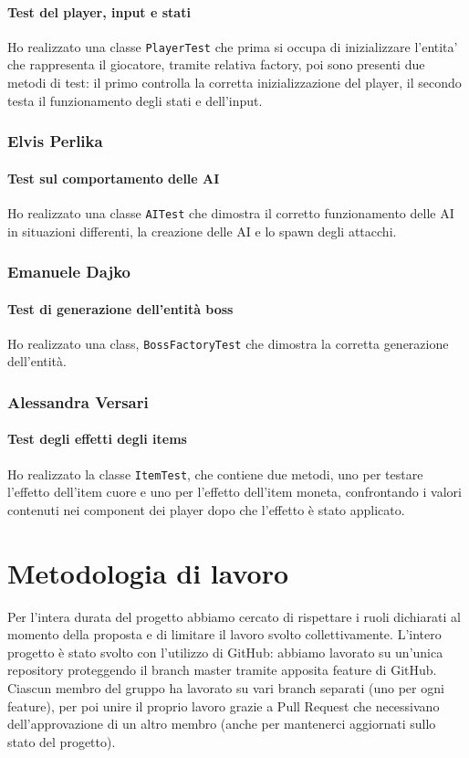 \documentclass[a4paper,12pt]{report}
\begin{document}
\paragraph*{Test del player, input e stati}
Ho realizzato una classe \texttt{PlayerTest} che prima si occupa di inizializzare l'entita' che rappresenta il giocatore, tramite relativa factory, poi sono presenti due metodi di test: il primo controlla la corretta inizializzazione del player, il secondo testa il funzionamento degli stati e dell'input. 

\subsubsection*{Elvis Perlika}
\paragraph*{Test sul comportamento delle AI}
Ho realizzato una classe \texttt{AITest} che dimostra il corretto funzionamento delle AI in
situazioni differenti, la creazione delle AI e lo spawn degli attacchi.

\subsubsection*{Emanuele Dajko}
\paragraph*{Test di generazione dell'entità boss}
Ho realizzato una class, \texttt{BossFactoryTest} che dimostra la corretta generazione dell'entità.

\subsubsection*{Alessandra Versari}
\paragraph*{Test degli effetti degli items}
Ho realizzato la classe \texttt{ItemTest}, che contiene due metodi, uno per testare l'effetto dell'item cuore e uno per l'effetto dell'item moneta, confrontando i valori contenuti nei component dei player dopo che l'effetto è stato applicato.

\section{Metodologia di lavoro}
Per l'intera durata del progetto abbiamo cercato di rispettare i ruoli dichiarati al momento della proposta e di limitare il lavoro svolto collettivamente. 
L'intero progetto è stato svolto con l'utilizzo di GitHub: abbiamo lavorato su un'unica repository proteggendo il branch master tramite apposita feature di GitHub.
Ciascun membro del gruppo ha lavorato su vari branch separati (uno per ogni feature), per poi unire il proprio lavoro grazie a Pull Request che necessivano dell'approvazione di un altro membro (anche per mantenerci aggiornati sullo stato del progetto).
\end{document}
